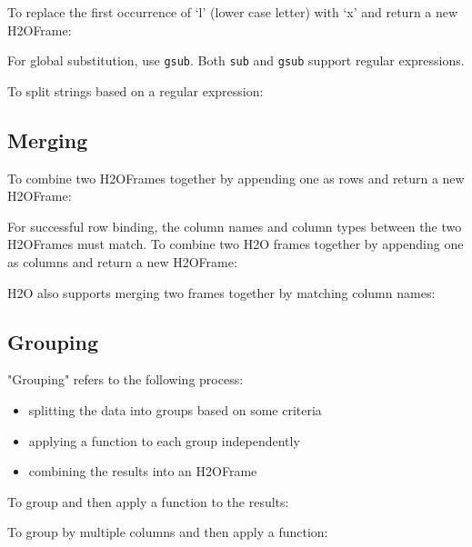 {To replace the first occurrence of `l' (lower case letter) with `x' and return a new H2OFrame:


For global substitution, use {\texttt{gsub}}.  Both {\texttt{sub}} and {\texttt{gsub}} support regular expressions. 

To split strings based on a regular expression:


\newpage
\subsection{Merging}
To combine two H2OFrames together by appending one as rows and return a new H2OFrame:


For successful row binding, the column names and column types between the two H2OFrames must match. To combine two H2O frames together by appending one as columns and return a new H2OFrame:



\newpage
H2O also supports merging two frames together by matching column names:


\subsection{Grouping}

"Grouping" refers to the following process:

\begin{itemize}
\item splitting the data into groups based on some criteria 
\item applying a function to each group independently
\item combining the results into an H2OFrame
\end{itemize}

To group and then apply a function to the results:


To group by multiple columns and then apply a function:


}
